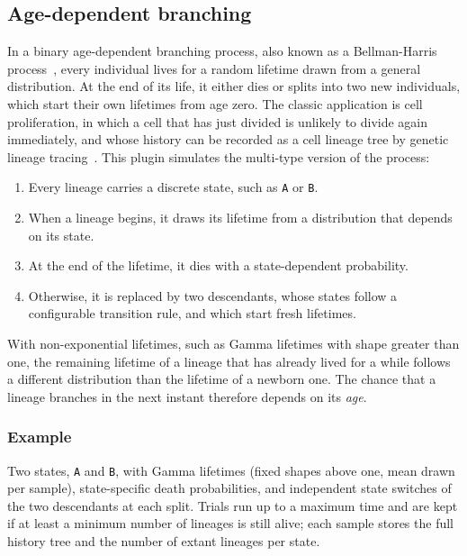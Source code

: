 \documentclass[11pt]{article}
\begin{document}
\subsection{Age-dependent branching}
\label{sec:age-dependent-branching}

In a binary age-dependent branching process, also known as a Bellman-Harris
process~\citep{harris1963theory}, every individual lives for a random lifetime
drawn from a general distribution. At the end of its life, it either dies or
splits into two new individuals, which start their own lifetimes from age zero.
The classic application is cell proliferation, in which a cell that has just
divided is unlikely to divide again immediately, and whose history can be
recorded as a cell lineage tree by genetic lineage
tracing~\citep{seidel2022tidetree}. This plugin simulates the multi-type version
of the process:

\begin{enumerate}
  \item Every lineage carries a discrete state, such as \texttt{A} or
        \texttt{B}.
  \item When a lineage begins, it draws its lifetime from a distribution that
        depends on its state.
  \item At the end of the lifetime, it dies with a state-dependent probability.
  \item Otherwise, it is replaced by two descendants, whose states follow a
        configurable transition rule, and which start fresh lifetimes.
\end{enumerate}

With non-exponential lifetimes, such as Gamma lifetimes with shape greater than
one, the remaining lifetime of a lineage that has already lived for a while
follows a different distribution than the lifetime of a newborn one. The chance
that a lineage branches in the next instant therefore depends on its
\emph{age}.

\subsubsection*{Example}

Two states, \texttt{A} and \texttt{B}, with Gamma lifetimes (fixed shapes above
one, mean drawn per sample), state-specific death probabilities, and independent
state switches of the two descendants at each split. Trials run up to a maximum
time and are kept if at least a minimum number of lineages is still alive; each
sample stores the full history tree and the number of extant lineages per state.
\end{document}
